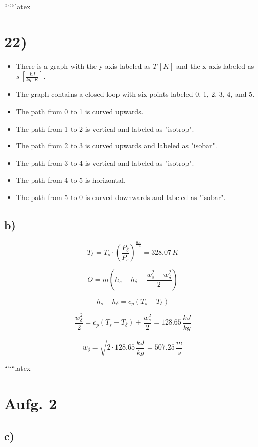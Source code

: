 
``````latex


\section*{22)}

\begin{itemize}
    \item There is a graph with the y-axis labeled as $T \, [K]$ and the x-axis labeled as $s \, \left[ \frac{kJ}{kg \cdot K} \right]$.
    \item The graph contains a closed loop with six points labeled 0, 1, 2, 3, 4, and 5.
    \item The path from 0 to 1 is curved upwards.
    \item The path from 1 to 2 is vertical and labeled as "isotrop".
    \item The path from 2 to 3 is curved upwards and labeled as "isobar".
    \item The path from 3 to 4 is vertical and labeled as "isotrop".
    \item The path from 4 to 5 is horizontal.
    \item The path from 5 to 0 is curved downwards and labeled as "isobar".
\end{itemize}

\subsection*{b)}

\[
T_{\delta} = T_s \cdot \left( \frac{P_{\delta}}{P_s} \right)^{\frac{0.4}{1.4}} = 328.07 \, K
\]

\[
O = \dot{m} \left( h_s - h_{\delta} + \frac{w_s^2 - w_{\delta}^2}{2} \right)
\]

\[
h_s - h_{\delta} = c_p (T_s - T_{\delta})
\]

\[
\frac{w_{\delta}^2}{2} = c_p (T_s - T_{\delta}) + \frac{w_s^2}{2} = 128.65 \, \frac{kJ}{kg}
\]

\[
w_{\delta} = \sqrt{2 \cdot 128.65 \, \frac{kJ}{kg}} = 507.25 \, \frac{m}{s}
\]

``````latex


\section*{Aufg. 2}

\subsection*{c)}

